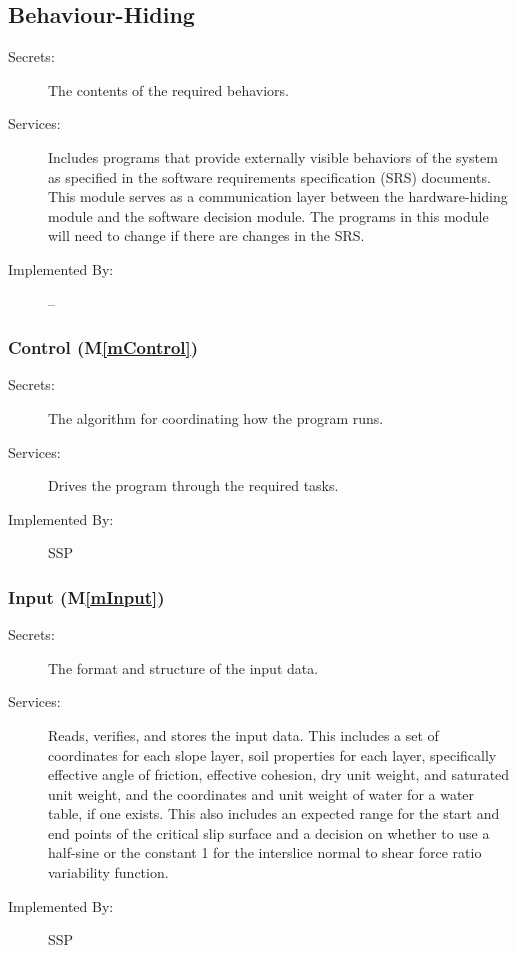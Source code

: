 \documentclass[12pt, titlepage]{article}
\newcommand{\progname}{SSP}
\newcommand{\mref}[1]{M\ref{#1}}
\begin{document}
\subsection{Behaviour-Hiding}

\begin{description}
\item[Secrets:]The contents of the required behaviors.
\item[Services:]Includes programs that provide externally visible
  behaviors of the system as specified in the software requirements
  specification (SRS) documents. This module serves as a communication
  layer between the hardware-hiding module and the software decision
  module. The programs in this module will need to change if there are
  changes in the SRS.
\item[Implemented By:] --
\end{description}

\subsubsection{Control (\mref{mControl})}

\begin{description}
\item[Secrets:] The algorithm for coordinating how the program runs.
\item[Services:] Drives the program through the required tasks.
\item[Implemented By:] \progname
\end{description}


\subsubsection{Input (\mref{mInput})}

\begin{description}
\item[Secrets:]The format and structure of the input data.
\item[Services:] Reads, verifies, and stores the input data. This includes a 
set of coordinates for each slope layer, soil properties for each layer, 
specifically effective angle of friction, effective cohesion, dry unit 
  weight, and saturated unit weight, and the coordinates and unit weight of 
  water for a water table, if one exists. This also includes an expected range 
  for the start and end points of the critical slip surface and a decision on 
  whether to use a half-sine or the constant 1 for the interslice normal to 
  shear force ratio variability function.
\item[Implemented By:] \progname
\end{description}
\end{document}
